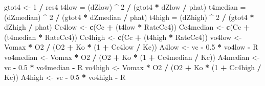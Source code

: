 \documentclass[
]{krantz}
\makeatletter
\newenvironment{Shaded}{\begin{snugshade}}{\end{snugshade}}
\newcommand{\DecValTok}[1]{\textcolor[rgb]{0.00,0.00,0.81}{#1}}
\newcommand{\FloatTok}[1]{\textcolor[rgb]{0.00,0.00,0.81}{#1}}
\newcommand{\KeywordTok}[1]{\textcolor[rgb]{0.13,0.29,0.53}{\textbf{#1}}}
\newcommand{\NormalTok}[1]{#1}
\newcommand{\OperatorTok}[1]{\textcolor[rgb]{0.81,0.36,0.00}{\textbf{#1}}}
\newcommand{\StringTok}[1]{\textcolor[rgb]{0.31,0.60,0.02}{#1}}
\newenvironment{kframe}{%
\medskip{}
\setlength{\fboxsep}{.8em}
 \def\at@end@of@kframe{}%
 \ifinner\ifhmode%
  \def\at@end@of@kframe{\end{minipage}}%
  \begin{minipage}{\columnwidth}%
 \fi\fi%
 \def\FrameCommand##1{\hskip\@totalleftmargin \hskip-\fboxsep
 \colorbox{shadecolor}{##1}\hskip-\fboxsep
     \hskip-\linewidth \hskip-\@totalleftmargin \hskip\columnwidth}%
 \MakeFramed {\advance\hsize-\width
   \@totalleftmargin\z@ \linewidth\hsize
   \@setminipage}}%
 {\par\unskip\endMakeFramed%
 \at@end@of@kframe}
\renewenvironment{Shaded}{\begin{kframe}}{\end{kframe}}
\makeatother
\begin{document}
\begin{Shaded}
\begin{Highlighting}[]
\NormalTok{gtot4 \textless{}{-}}\StringTok{ }\DecValTok{1} \OperatorTok{/}\StringTok{ }\NormalTok{res4}
\NormalTok{t4low =}\StringTok{ }\NormalTok{(dZlow) }\OperatorTok{\^{}}\StringTok{ }\DecValTok{2} \OperatorTok{/}\StringTok{ }\NormalTok{(gtot4 }\OperatorTok{*}\StringTok{ }\NormalTok{dZlow }\OperatorTok{/}\StringTok{ }\NormalTok{phat)}
\NormalTok{t4median =}\StringTok{ }\NormalTok{(dZmedian) }\OperatorTok{\^{}}\StringTok{ }\DecValTok{2} \OperatorTok{/}\StringTok{ }\NormalTok{(gtot4 }\OperatorTok{*}\StringTok{ }\NormalTok{dZmedian }\OperatorTok{/}\StringTok{ }\NormalTok{phat)}
\NormalTok{t4high =}\StringTok{ }\NormalTok{(dZhigh) }\OperatorTok{\^{}}\StringTok{ }\DecValTok{2} \OperatorTok{/}\StringTok{ }\NormalTok{(gtot4 }\OperatorTok{*}\StringTok{ }\NormalTok{dZhigh }\OperatorTok{/}\StringTok{ }\NormalTok{phat)}
\NormalTok{Cc4low \textless{}{-}}\StringTok{ }\KeywordTok{c}\NormalTok{(Cc }\OperatorTok{+}\StringTok{ }\NormalTok{(t4low }\OperatorTok{*}\StringTok{ }\NormalTok{RateCc4))}
\NormalTok{Cc4median \textless{}{-}}\StringTok{ }\KeywordTok{c}\NormalTok{(Cc }\OperatorTok{+}\StringTok{ }\NormalTok{(t4median }\OperatorTok{*}\StringTok{ }\NormalTok{RateCc4))}
\NormalTok{Cc4high \textless{}{-}}\StringTok{ }\KeywordTok{c}\NormalTok{(Cc }\OperatorTok{+}\StringTok{ }\NormalTok{(t4high }\OperatorTok{*}\StringTok{ }\NormalTok{RateCc4))}
\NormalTok{vo4low \textless{}{-}}\StringTok{ }\NormalTok{Vomax }\OperatorTok{*}\StringTok{ }\NormalTok{O2 }\OperatorTok{/}\StringTok{ }\NormalTok{(O2 }\OperatorTok{+}\StringTok{ }\NormalTok{Ko }\OperatorTok{*}\StringTok{ }\NormalTok{(}\DecValTok{1} \OperatorTok{+}\StringTok{ }\NormalTok{Cc4low }\OperatorTok{/}\StringTok{ }\NormalTok{Kc)) }
\NormalTok{A4low \textless{}{-}}\StringTok{ }\NormalTok{vc }\OperatorTok{{-}}\StringTok{ }\FloatTok{0.5} \OperatorTok{*}\StringTok{ }\NormalTok{vo4low }\OperatorTok{{-}}\StringTok{ }\NormalTok{R }
\NormalTok{vo4median \textless{}{-}}\StringTok{ }\NormalTok{Vomax }\OperatorTok{*}\StringTok{ }\NormalTok{O2 }\OperatorTok{/}\StringTok{ }\NormalTok{(O2 }\OperatorTok{+}\StringTok{ }\NormalTok{Ko }\OperatorTok{*}\StringTok{ }\NormalTok{(}\DecValTok{1} \OperatorTok{+}\StringTok{ }\NormalTok{Cc4median }\OperatorTok{/}\StringTok{ }\NormalTok{Kc)) }
\NormalTok{A4median \textless{}{-}}\StringTok{ }\NormalTok{vc }\OperatorTok{{-}}\StringTok{ }\FloatTok{0.5} \OperatorTok{*}\StringTok{ }\NormalTok{vo4median }\OperatorTok{{-}}\StringTok{ }\NormalTok{R }
\NormalTok{vo4high \textless{}{-}}\StringTok{ }\NormalTok{Vomax }\OperatorTok{*}\StringTok{ }\NormalTok{O2 }\OperatorTok{/}\StringTok{ }\NormalTok{(O2 }\OperatorTok{+}\StringTok{ }\NormalTok{Ko }\OperatorTok{*}\StringTok{ }\NormalTok{(}\DecValTok{1} \OperatorTok{+}\StringTok{ }\NormalTok{Cc4high }\OperatorTok{/}\StringTok{ }\NormalTok{Kc)) }
\NormalTok{A4high \textless{}{-}}\StringTok{ }\NormalTok{vc }\OperatorTok{{-}}\StringTok{ }\FloatTok{0.5} \OperatorTok{*}\StringTok{ }\NormalTok{vo4high }\OperatorTok{{-}}\StringTok{ }\NormalTok{R }


\end{Highlighting}
\end{Shaded}
\end{document}
